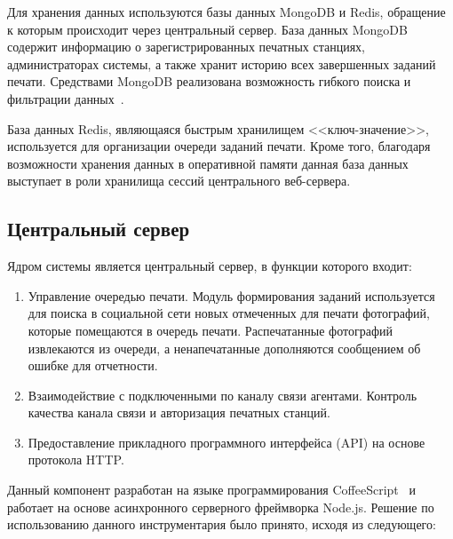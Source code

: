 \documentclass[a4paper,14pt,href,draft]{article}
\begin{document}
Для хранения данных используются базы данных MongoDB и Re\-dis, обращение к которым происходит через центральный сервер.
База данных MongoDB содержит информацию о зарегистрированных печатных станциях, администраторах системы, а также хранит
историю всех завершенных заданий печати. Средствами MongoDB реализована возможность гибкого поиска и
фильтрации данных~\cite{MongoDBBook}.

База данных Redis, являющаяся быстрым хранилищем <<ключ-\-зна\-че\-ние>>, используется для организации очереди
заданий печати. Кроме того, благодаря возможности хранения данных в оперативной памяти данная база данных выступает в
роли хранилища сессий центрального веб-сервера.

\subsection{Центральный сервер}
Ядром системы является центральный сервер, в функции которого входит:

\begin{enumerate}
  \item Управление очередью печати. Модуль формирования заданий используется для поиска в социальной сети новых
  отмеченных для печати фотографий, которые помещаются в очередь печати. Распечатанные фотографий извлекаются из
  очереди, а ненапечатанные дополняются сообщением об ошибке для отчетности.

  \item Взаимодействие с подключенными по каналу связи агентами. Контроль качества канала связи и авторизация
  печатных станций.

  \item Предоставление прикладного программного интерфейса (API) на основе протокола HTTP.
\end{enumerate}

Данный компонент разработан на языке программирования \linebreak CoffeeScript~\cite{LittleCoffeeScript} и работает
на основе асинхронного серверного фреймворка Node.js. Решение по использованию данного инструментария было принято,
исходя из следующего:
\end{document}
